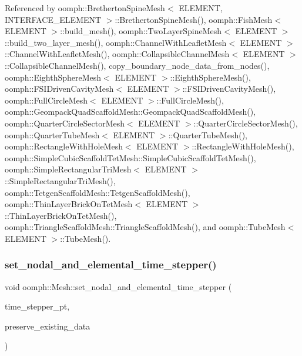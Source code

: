 Referenced by oomph\+::\+Bretherton\+Spine\+Mesh$<$ E\+L\+E\+M\+E\+N\+T, I\+N\+T\+E\+R\+F\+A\+C\+E\+\_\+\+E\+L\+E\+M\+E\+N\+T $>$\+::\+Bretherton\+Spine\+Mesh(), oomph\+::\+Fish\+Mesh$<$ E\+L\+E\+M\+E\+N\+T $>$\+::build\+\_\+mesh(), oomph\+::\+Two\+Layer\+Spine\+Mesh$<$ E\+L\+E\+M\+E\+N\+T $>$\+::build\+\_\+two\+\_\+layer\+\_\+mesh(), oomph\+::\+Channel\+With\+Leaflet\+Mesh$<$ E\+L\+E\+M\+E\+N\+T $>$\+::\+Channel\+With\+Leaflet\+Mesh(), oomph\+::\+Collapsible\+Channel\+Mesh$<$ E\+L\+E\+M\+E\+N\+T $>$\+::\+Collapsible\+Channel\+Mesh(), copy\+\_\+boundary\+\_\+node\+\_\+data\+\_\+from\+\_\+nodes(), oomph\+::\+Eighth\+Sphere\+Mesh$<$ E\+L\+E\+M\+E\+N\+T $>$\+::\+Eighth\+Sphere\+Mesh(), oomph\+::\+F\+S\+I\+Driven\+Cavity\+Mesh$<$ E\+L\+E\+M\+E\+N\+T $>$\+::\+F\+S\+I\+Driven\+Cavity\+Mesh(), oomph\+::\+Full\+Circle\+Mesh$<$ E\+L\+E\+M\+E\+N\+T $>$\+::\+Full\+Circle\+Mesh(), oomph\+::\+Geompack\+Quad\+Scaffold\+Mesh\+::\+Geompack\+Quad\+Scaffold\+Mesh(), oomph\+::\+Quarter\+Circle\+Sector\+Mesh$<$ E\+L\+E\+M\+E\+N\+T $>$\+::\+Quarter\+Circle\+Sector\+Mesh(), oomph\+::\+Quarter\+Tube\+Mesh$<$ E\+L\+E\+M\+E\+N\+T $>$\+::\+Quarter\+Tube\+Mesh(), oomph\+::\+Rectangle\+With\+Hole\+Mesh$<$ E\+L\+E\+M\+E\+N\+T $>$\+::\+Rectangle\+With\+Hole\+Mesh(), oomph\+::\+Simple\+Cubic\+Scaffold\+Tet\+Mesh\+::\+Simple\+Cubic\+Scaffold\+Tet\+Mesh(), oomph\+::\+Simple\+Rectangular\+Tri\+Mesh$<$ E\+L\+E\+M\+E\+N\+T $>$\+::\+Simple\+Rectangular\+Tri\+Mesh(), oomph\+::\+Tetgen\+Scaffold\+Mesh\+::\+Tetgen\+Scaffold\+Mesh(), oomph\+::\+Thin\+Layer\+Brick\+On\+Tet\+Mesh$<$ E\+L\+E\+M\+E\+N\+T $>$\+::\+Thin\+Layer\+Brick\+On\+Tet\+Mesh(), oomph\+::\+Triangle\+Scaffold\+Mesh\+::\+Triangle\+Scaffold\+Mesh(), and oomph\+::\+Tube\+Mesh$<$ E\+L\+E\+M\+E\+N\+T $>$\+::\+Tube\+Mesh().

\mbox{\label{classoomph_1_1Mesh_a6c9a84e7e912c2fef3f513bfcd50fc70}} 
\subsubsection{\texorpdfstring{set\+\_\+nodal\+\_\+and\+\_\+elemental\+\_\+time\+\_\+stepper()}{set\_nodal\_and\_elemental\_time\_stepper()}}
{\footnotesize\ttfamily void oomph\+::\+Mesh\+::set\+\_\+nodal\+\_\+and\+\_\+elemental\+\_\+time\+\_\+stepper (\begin{DoxyParamCaption}\item[{\hyperlink{classoomph_1_1TimeStepper}{Time\+Stepper} $\ast$const \&}]{time\+\_\+stepper\+\_\+pt,  }\item[{const bool \&}]{preserve\+\_\+existing\+\_\+data }\end{DoxyParamCaption})\hspace{0.3cm}{\ttfamily [inline]}}




